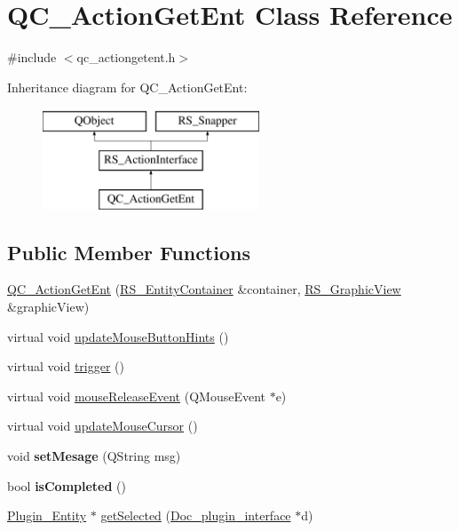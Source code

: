 \hypertarget{classQC__ActionGetEnt}{\section{Q\-C\-\_\-\-Action\-Get\-Ent Class Reference}
\label{classQC__ActionGetEnt}
}


{\ttfamily \#include $<$qc\-\_\-actiongetent.\-h$>$}

Inheritance diagram for Q\-C\-\_\-\-Action\-Get\-Ent\-:\begin{figure}[H]
\begin{center}
\leavevmode
\includegraphics[height=3.000000cm]{classQC__ActionGetEnt}
\end{center}
\end{figure}
\subsection*{Public Member Functions}
\begin{DoxyCompactItemize}
\item 
\hyperlink{classQC__ActionGetEnt_a49c8194069ac41870a323b32d12aff43}{Q\-C\-\_\-\-Action\-Get\-Ent} (\hyperlink{classRS__EntityContainer}{R\-S\-\_\-\-Entity\-Container} \&container, \hyperlink{classRS__GraphicView}{R\-S\-\_\-\-Graphic\-View} \&graphic\-View)
\item 
virtual void \hyperlink{classQC__ActionGetEnt_ab306eab24e4437ed8fc780c1af3941ca}{update\-Mouse\-Button\-Hints} ()
\item 
virtual void \hyperlink{classQC__ActionGetEnt_ad7ff94efca46d93b005eb1288e4a11eb}{trigger} ()
\item 
virtual void \hyperlink{classQC__ActionGetEnt_ac2f4cd1f477615cea214b0e0688631a5}{mouse\-Release\-Event} (Q\-Mouse\-Event $\ast$e)
\item 
virtual void \hyperlink{classQC__ActionGetEnt_adf5a6bccbca7553c605a4d4e0effedd7}{update\-Mouse\-Cursor} ()
\item 
\hypertarget{classQC__ActionGetEnt_ac0956eaad29751cca506e8b78719dd95}{void {\bfseries set\-Mesage} (Q\-String msg)}\label{classQC__ActionGetEnt_ac0956eaad29751cca506e8b78719dd95}

\item 
\hypertarget{classQC__ActionGetEnt_a502eebbf8727a390c7595f70b5598bf6}{bool {\bfseries is\-Completed} ()}\label{classQC__ActionGetEnt_a502eebbf8727a390c7595f70b5598bf6}

\item 
\hyperlink{classPlugin__Entity}{Plugin\-\_\-\-Entity} $\ast$ \hyperlink{classQC__ActionGetEnt_abb77270007e2c2f4b4177559c971cd60}{get\-Selected} (\hyperlink{classDoc__plugin__interface}{Doc\-\_\-plugin\-\_\-interface} $\ast$d)
\end{DoxyCompactItemize}
